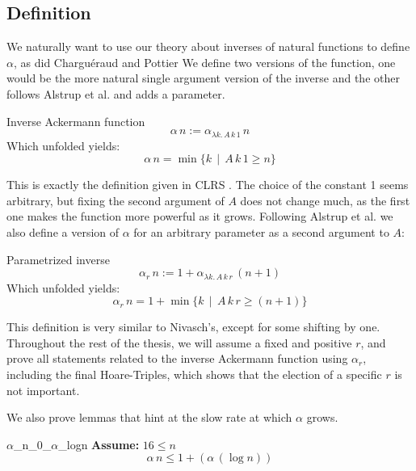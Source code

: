 \documentclass[headsepline,footsepline,footinclude=false,oneside,fontsize=11pt,paper=a4,listof=totoc,bibliography=totoc]{scrbook} %
\begin{document}
\subsection{Definition}
We naturally want to use our theory about inverses of natural functions to define $\alpha$, as did Charguéraud and Pottier We define two versions of the function, one would be the more natural single argument version of the inverse and the other follows Alstrup et al. \cite{Alstrup14} and adds a parameter.

\begin{definition}{Inverse Ackermann function}
	\begin{equation}
	\alpha \, n := \alpha_{\lambda k.\, A\, k\, 1} \, n
	\end{equation}
	Which unfolded yields:
	\begin{equation}
	\alpha \, n = \min \{ k \,\mid\, A\, k\, 1 \geq n \}
	\end{equation}
\end{definition}

This is exactly the definition given in CLRS \cite[pg. 574]{CLRS09}. The choice of the constant 1 seems arbitrary, but fixing the second argument of $A$ does not change much, as the first one makes the function more powerful as it grows. Following Alstrup et al. we also define a version of $\alpha$ for an arbitrary parameter as a second argument to $A$:

\begin{definition}{Parametrized inverse}
\begin{equation}
	\alpha_r \, n := 1 + \alpha_{\lambda k.\, A\, k\, r} \, (n + 1) \label{alphar}
\end{equation}
Which unfolded yields:
\begin{equation}
	\alpha_r \, n = 1 + \min\{ k \,\mid\, A\, k\, r \geq (n + 1) \}
\end{equation}
\end{definition}

This definition is very similar to Nivasch's, except for some shifting by one. Throughout the rest of the thesis, we will assume a fixed and positive $r$, and prove all statements related to the inverse Ackermann function using $\alpha_r$, including the final Hoare-Triples, which shows that the election of a specific $r$ is not important.

We also prove lemmas that hint at the slow rate at which $\alpha$ grows. 

\begin{lemma}{$\alpha$\_n\_0\_$\alpha$\_logn}
	\newline
	\textbf{Assume:} $16 \leq n$
	\begin{equation}
	\alpha \, n \leq 1 + (\alpha \, (\log{n}))
	\end{equation}
	
\end{lemma}
\end{document}
